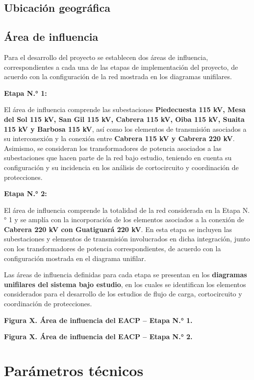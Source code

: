 \documentclass[12pt]{article}
\begin{document}
\subsection{Ubicación geográfica}

\subsection{Área de influencia}
Para el desarrollo del proyecto se establecen dos áreas de influencia, correspondientes a cada una de las etapas de implementación del proyecto, de acuerdo con la configuración de la red mostrada en los diagramas unifilares.

\textbf{Etapa N.° 1:}

El área de influencia comprende las subestaciones \textbf{Piedecuesta 115 kV, Mesa del Sol 115 kV, San Gil 115 kV, Cabrera 115 kV, Oiba 115 kV, Suaita 115 kV y Barbosa 115 kV}, así como los elementos de transmisión asociados a su interconexión y la conexión entre \textbf{Cabrera 115 kV y Cabrera 220 kV}. Asimismo, se consideran los transformadores de potencia asociados a las subestaciones que hacen parte de la red bajo estudio, teniendo en cuenta su configuración y su incidencia en los análisis de cortocircuito y coordinación de protecciones.

\textbf{Etapa N.° 2:}

El área de influencia comprende la totalidad de la red considerada en la Etapa N.° 1 y se amplía con la incorporación de los elementos asociados a la conexión de \textbf{Cabrera 220 kV con Guatiguará 220 kV}. En esta etapa se incluyen las subestaciones y elementos de transmisión involucrados en dicha integración, junto con los transformadores de potencia correspondientes, de acuerdo con la configuración mostrada en el diagrama unifilar.

Las áreas de influencia definidas para cada etapa se presentan en los \textbf{diagramas unifilares del sistema bajo estudio}, en los cuales se identifican los elementos considerados para el desarrollo de los estudios de flujo de carga, cortocircuito y coordinación de protecciones.

\textbf{Figura X. Área de influencia del EACP -- Etapa N.° 1.}

\textbf{Figura X. Área de influencia del EACP -- Etapa N.° 2.}


\section{Parámetros técnicos}
\end{document}
